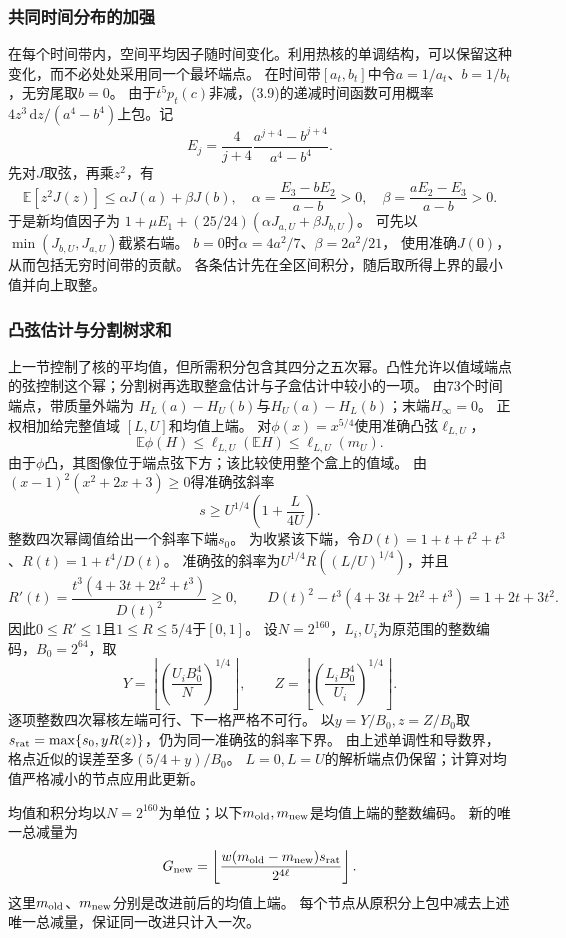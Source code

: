 \documentclass[UTF8,fontset=fandol,zihao=-4,a4paper]{ctexart}
\newcommand{\E}{\mathbb E}
\newcommand{\1}{\mathbf 1}
\newcommand{\dd}{\,\mathrm d}
\begin{document}
\subsubsection{共同时间分布的加强}
在每个时间带内，空间平均因子随时间变化。利用热核的单调结构，可以保留这种变化，而不必处处采用同一个最坏端点。
在时间带$[a_t,b_t]$中令$a=1/a_t$、$b=1/b_t$，无穷尾取$b=0$。
由于$t^5p_t(c)$非减，(3.9)的递减时间函数可用概率
$4z^3\dd z/(a^4-b^4)$上包。记
\[
 E_j=\frac4{j+4}\frac{a^{j+4}-b^{j+4}}{a^4-b^4}.
\]
先对$J$取弦，再乘$z^2$，有
\[
 \E[z^2J(z)]\le\alpha J(a)+\beta J(b),\quad
 \alpha=\frac{E_3-bE_2}{a-b}>0,\quad
 \beta=\frac{aE_2-E_3}{a-b}>0.                         \tag{3.10}
\]
于是新均值因子为
$1+\mu E_1+(25/24)(\alpha J_{a,U}+\beta J_{b,U})$。
可先以$\min(J_{b,U},J_{a,U})$截紧右端。
$b=0$时$\alpha=4a^2/7$、$\beta=2a^2/21$，
使用准确$J(0)$，从而包括无穷时间带的贡献。
各条估计先在全区间积分，随后取所得上界的最小值并向上取整。

\subsubsection{凸弦估计与分割树求和}
上一节控制了核的平均值，但所需积分包含其四分之五次幂。凸性允许以值域端点的弦控制这个幂；分割树再选取整盒估计与子盒估计中较小的一项。
由73个时间端点，带质量外端为
$H_L(a)-H_U(b)$与$H_U(a)-H_L(b)$；末端$H_\infty=0$。
正权相加给完整值域 $[L,U]$和均值上端。
对$\phi(x)=x^{5/4}$使用准确凸弦$\ell_{L,U}$，
\[
 \E\phi(H)\le\ell_{L,U}(\E H)\le\ell_{L,U}(m_U).
\]
由于$\phi$凸，其图像位于端点弦下方；该比较使用整个盒上的值域。
由$(x-1)^2(x^2+2x+3)\ge0$得准确弦斜率
\[
 s\ge U^{1/4}\left(1+\frac L{4U}\right).
\]
整数四次幂阈值给出一个斜率下端$s_0$。
为收紧该下端，令$D(t)=1+t+t^2+t^3$、$R(t)=1+t^4/D(t)$。
准确弦的斜率为$U^{1/4}R((L/U)^{1/4})$，并且
\[
 R'(t)=\frac{t^3(4+3t+2t^2+t^3)}{D(t)^2}\ge0,\qquad
 D(t)^2-t^3(4+3t+2t^2+t^3)=1+2t+3t^2.
\]
因此$0\le R'\le1$且$1\le R\le5/4$于$[0,1]$。
设$N=2^{160}$，$L_i,U_i$为原范围的整数编码，$B_0=2^{64}$，取
\[
 Y=\left\lfloor\left(\frac{U_iB_0^4}{N}\right)^{1/4}\right\rfloor,
 \qquad
 Z=\left\lfloor\left(\frac{L_iB_0^4}{U_i}\right)^{1/4}\right\rfloor.
\]
逐项整数四次幂核左端可行、下一格严格不可行。
以$y=Y/B_0,z=Z/B_0$取
$s_{\rm rat}=\max\{s_0,yR(z)\}$，仍为同一准确弦的斜率下界。
由上述单调性和导数界，格点近似的误差至多$(5/4+y)/B_0$。
$L=0,L=U$的解析端点仍保留；计算对均值严格减小的节点应用此更新。

均值和积分均以$N=2^{160}$为单位；以下$m_{\rm old},m_{\rm new}$是均值上端的整数编码。
新的唯一总减量为
\[
 G_{\rm new}=\left\lfloor
 \frac{w(m_{\rm old}-m_{\rm new})s_{\rm rat}}{2^{4\ell}}\right\rfloor.
\]
这里$m_{\rm old}$、$m_{\rm new}$分别是改进前后的均值上端。
每个节点从原积分上包中减去上述唯一总减量，保证同一改进只计入一次。
\end{document}
